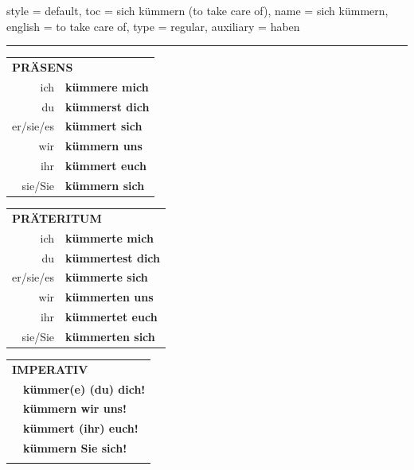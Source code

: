 \begin{verbentry}{
  style = {default},
  toc = {sich kümmern (to take care of)},
  name = {sich kümmern},
  english = {to take care of},
  type = {regular},
  auxiliary = {haben}
}
 
    
       \vspace{5pt}

    \hrule
    
    \vspace{5pt}

  \begin{tabular}{rl}
     \multicolumn{2}{l}{\textbf{PRÄSENS} }\\
    ich & \textbf{kümmere mich}\\
    du & \textbf{kümmerst dich}\\
    er/sie/es & \textbf{kümmert sich}\\
    wir & \textbf{kümmern uns}\\
    ihr & \textbf{kümmert euch}\\
    sie/Sie & \textbf{kümmern sich}\\
  \end{tabular}
  \hfill
     \begin{tabular}{rl}
    \multicolumn{2}{l}{\textbf{PRÄTERITUM} }\\
    ich & \textbf{kümmerte mich}\\
    du & \textbf{kümmertest dich}\\
    er/sie/es & \textbf{kümmerte sich}\\
    wir & \textbf{kümmerten uns}\\
    ihr & \textbf{kümmertet euch}\\
    sie/Sie & \textbf{kümmerten sich}\\
  \end{tabular}
  \hfill
  \begin{tabular}{rl}
     \multicolumn{2}{l}{\textbf{IMPERATIV} }\\
   & \textbf{kümmer(e) (du) dich!}\\
   & \textbf{kümmern wir uns!}\\
   & \textbf{kümmert (ihr) euch!}\\
   & \textbf{kümmern Sie sich!}\\
   & \vspace{10pt}
  \end{tabular}

    \vspace{10pt}


\end{verbentry}
